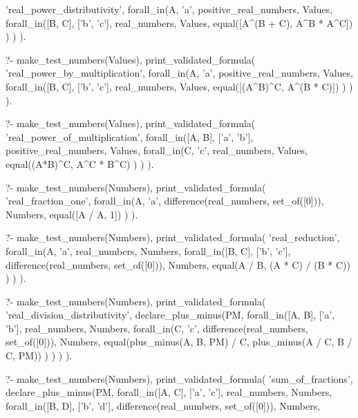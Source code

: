 \begin{fact}
\begin{prolog}
		'real_power_distributivity',
		forall_in(A, 'a', positive_real_numbers, Values,
			forall_in([B, C], ['b', 'c'], real_numbers, Values,
				equal([A^(B + C), A^B * A^C])
			)
		)
	).				
\end{prolog}
\begin{prolog}
?-	make_test_numbers(Values),
	print_validated_formula(
		'real_power_by_multiplication',
		forall_in(A, 'a', positive_real_numbers, Values,
			forall_in([B, C], ['b', 'c'], real_numbers, Values,
				equal([(A^B)^C, A^(B * C)])
			)
		)
	).
\end{prolog}
\begin{prolog}
?-	make_test_numbers(Values),
	print_validated_formula(
		'real_power_of_multiplication',
		forall_in([A, B], ['a', 'b'], positive_real_numbers, Values,
			forall_in(C, 'c', real_numbers, Values,
				equal((A*B)^C, A^C * B^C)
			)
		)
	).
\end{prolog}
\begin{prolog}
?-	make_test_numbers(Numbers),
	print_validated_formula(
		'real_fraction_one',
		forall_in(A, 'a', difference(real_numbers, set_of([0])), Numbers,
			equal([A / A, 1])
		)
	).
\end{prolog}
\begin{prolog}
?-	make_test_numbers(Numbers),
	print_validated_formula(
		'real_reduction',
		forall_in(A, 'a', real_numbers, Numbers,
			forall_in([B, C], ['b', 'c'], difference(real_numbers, set_of([0])), Numbers,
				equal(A / B, (A * C) / (B * C))
			)
		)
	).
\end{prolog}
\begin{prolog}
?-	make_test_numbers(Numbers),
	print_validated_formula(
		'real_division_distributivity',
		declare_plus_minus(PM,
			forall_in([A, B], ['a', 'b'], real_numbers, Numbers,
				forall_in(C, 'c', difference(real_numbers, set_of([0])), Numbers,
					equal(plus_minus(A, B, PM) / C, plus_minus(A / C, B / C, PM))
				)
			)
		)
	).
\end{prolog}
\begin{prolog}
?-	make_test_numbers(Numbers),
	print_validated_formula(
		'sum_of_fractions',
		declare_plus_minus(PM,
			forall_in([A, C], ['a', 'c'], real_numbers, Numbers,
				forall_in([B, D], ['b', 'd'], difference(real_numbers, set_of([0])), Numbers,

\end{prolog}
\end{fact}
